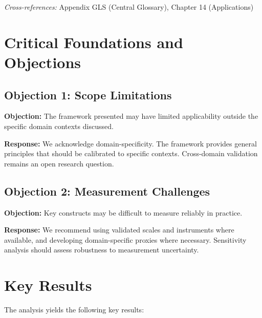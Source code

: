 \noindent\textit{Cross-references:}
Appendix GLS (Central Glossary), Chapter 14 (Applications)



\section{Critical Foundations and Objections}
\label{sec:cam-foundations}

\subsection{Objection 1: Scope Limitations}

\textbf{Objection:} The framework presented may have limited applicability
outside the specific domain contexts discussed.

\textbf{Response:} We acknowledge domain-specificity. The framework provides
general principles that should be calibrated to specific contexts. Cross-domain
validation remains an open research question.

\subsection{Objection 2: Measurement Challenges}

\textbf{Objection:} Key constructs may be difficult to measure reliably in
practice.

\textbf{Response:} We recommend using validated scales and instruments where
available, and developing domain-specific proxies where necessary. Sensitivity
analysis should assess robustness to measurement uncertainty.





\section{Key Results}
\label{sec:cam-results}

The analysis yields the following key results:

